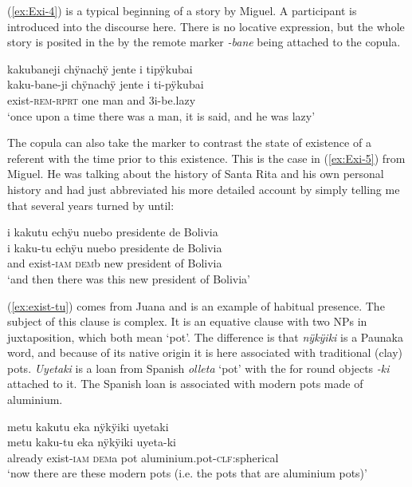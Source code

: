 (\ref{ex:Exi-4}) is a typical beginning of a story by Miguel. A participant is introduced into the discourse here. There is no locative expression, but the whole story is posited in the  by the remote marker \textit{-bane} being attached to the copula.

\ea\label{ex:Exi-4}
\begingl
\glpreamble kakubaneji chÿnachÿ jente i tipÿkubai\\
\gla kaku-bane-ji chÿnachÿ jente i ti-pÿkubai\\
\glb exist-\textsc{rem}-\textsc{rprt} one man and 3i-be.lazy\\
\glft ‘once upon a time there was a man, it is said, and he was lazy’
\endgl
\trailingcitation{[mox-n110920l.011]}
\xe

The copula can also take the  marker to contrast the state of existence of a referent with the time prior to this existence. This is the case in (\ref{ex:Exi-5}) from Miguel. He was talking about the history of Santa Rita and his own personal history and had just abbreviated his more detailed account by simply telling me that several years turned by until:

\ea\label{ex:Exi-5}
\begingl
\glpreamble i kakutu echÿu nuebo presidente de Bolivia\\
\gla i kaku-tu echÿu {nuebo presidente de Bolivia}\\
\glb and exist-\textsc{iam} \textsc{dem}b {new president of Bolivia}\\
\glft ‘and then there was this new president of Bolivia’
\endgl
\trailingcitation{[mxx-p110825l.035]}
\xe

(\ref{ex:exist-tu}) comes from Juana and is an example of habitual presence. The subject of this clause is complex. It is an equative clause with two NPs in juxtaposition, which both mean ‘pot’. The difference is that \textit{nÿkÿiki} is a Paunaka word, and because of its native origin it is here associated with traditional (clay) pots. \textit{Uyetaki} is a loan from Spanish \textit{olleta} ‘pot’ with the  for round objects \textit{-ki} attached to it. The Spanish loan is associated with modern pots made of aluminium.

\ea\label{ex:exist-tu}
\begingl 
\glpreamble metu kakutu eka nÿkÿiki uyetaki\\
\gla metu kaku-tu eka nÿkÿiki uyeta-ki\\ 
\glb already exist-\textsc{iam} \textsc{dem}a pot aluminium.pot-\textsc{clf}:spherical\\ 
\glft ‘now there are these modern pots (i.e. the pots that are aluminium pots)’\\ 
\endgl
\trailingcitation{[jxx-d110923l-2.41]}
\xe

